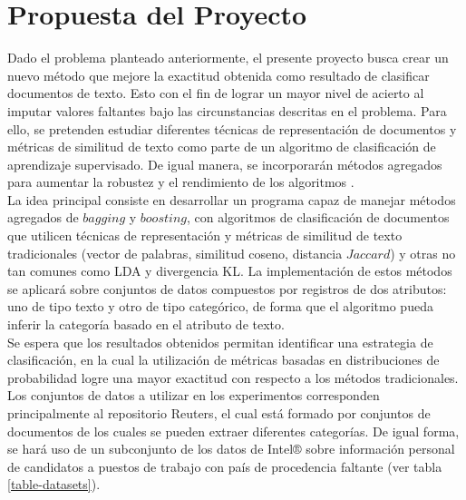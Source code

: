 \section{Propuesta del Proyecto}
Dado el problema planteado anteriormente, el presente proyecto busca crear un nuevo método que mejore la exactitud obtenida como resultado de clasificar documentos de texto. Esto con el fin de lograr un mayor nivel de acierto al imputar valores faltantes bajo las circunstancias descritas en el problema. Para ello, se pretenden estudiar diferentes técnicas de representación de documentos y métricas de similitud de texto como parte de un algoritmo de clasificación de aprendizaje supervisado. De igual manera, se incorporarán métodos agregados para aumentar la robustez y el rendimiento de los algoritmos \cite{sabzevari2015ensemble}. \\
La idea principal consiste en desarrollar un programa capaz de manejar métodos agregados de $bagging$ y $boosting$, con algoritmos de clasificación de documentos que utilicen técnicas de representación y métricas de similitud de texto tradicionales (vector de palabras, similitud coseno, distancia $Jaccard$) y otras no tan comunes como LDA y divergencia KL. La implementación de estos métodos se aplicará sobre conjuntos de datos compuestos por registros de dos atributos: uno de tipo texto y otro de tipo categórico, de forma que el algoritmo pueda inferir la categoría basado en el atributo de texto.\\
Se espera que los resultados obtenidos permitan identificar una estrategia de clasificación, en la cual la utilización de métricas basadas en distribuciones de probabilidad logre una mayor exactitud con respecto a los métodos tradicionales. Los conjuntos de datos a utilizar en los experimentos corresponden principalmente al repositorio Reuters, el cual está formado por conjuntos de documentos de los cuales se pueden extraer diferentes categorías. De igual forma, se hará uso de un subconjunto de los datos de Intel® sobre información personal de candidatos a puestos de trabajo con país de procedencia faltante (ver tabla \ref{table-datasets}). \\ 

